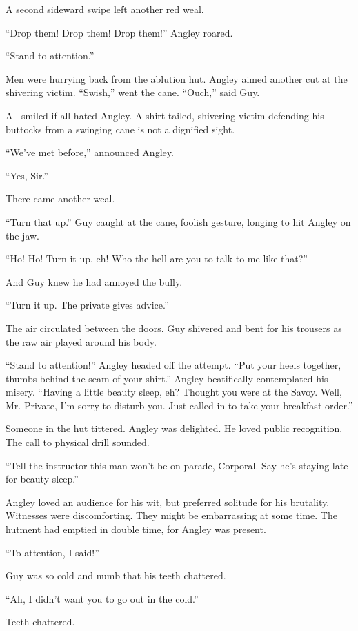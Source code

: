 A second sideward swipe left another red weal.

``Drop them! Drop them! Drop them!'' Angley roared.

``Stand to attention.''

Men were hurrying back from the ablution hut. Angley aimed another cut at 
the shivering victim. ``Swish,'' went the cane. ``Ouch,'' said Guy.

All smiled if all hated Angley. A shirt-tailed, shivering victim defending 
his buttocks from a swinging cane is not a dignified sight.

``We've met before,'' announced Angley.

``Yes, Sir.''

There came another weal.

``Turn that up.'' Guy caught at the cane, foolish gesture, longing to hit 
Angley on the jaw.

``Ho! Ho! Turn it up, eh! Who the hell are you to talk to me like that?''

And Guy knew he had annoyed the bully.

``Turn it up. The private gives advice.''

The air circulated between the doors. Guy shivered and bent for his trousers 
as the raw air played around his body.

``Stand to attention!'' Angley headed off the attempt. ``Put your heels together, 
thumbs behind the seam of your shirt.'' Angley beatifically contemplated his 
misery. ``Having a little beauty sleep, eh? Thought you were at the Savoy. 
Well, Mr. Private, I'm sorry to disturb you. Just called in to take your 
breakfast order.''

Someone in the hut tittered. Angley was delighted. He loved public recognition. 
The call to physical drill sounded.

``Tell the instructor this man won't be on parade, Corporal. Say he's staying 
late for beauty sleep.''

Angley loved an audience for his wit, but preferred solitude for his brutality. 
Witnesses were discomforting. They might be embarrassing at some time. The hutment 
had emptied in double time, for Angley was present.

``To attention, I said!''

Guy was so cold and numb that his teeth chattered.

``Ah, I didn't want you to go out in the cold.''

Teeth chattered.

